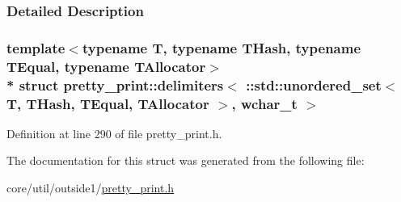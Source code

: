 \subsubsection{Detailed Description}
\subsubsection*{template$<$typename T, typename T\+Hash, typename T\+Equal, typename T\+Allocator$>$\\*
struct pretty\+\_\+print\+::delimiters$<$ \+::std\+::unordered\+\_\+set$<$ T, T\+Hash, T\+Equal, T\+Allocator $>$, wchar\+\_\+t $>$}



Definition at line 290 of file pretty\+\_\+print.\+h.



The documentation for this struct was generated from the following file\+:\begin{DoxyCompactItemize}
\item 
core/util/outside1/\hyperlink{pretty__print_8h}{pretty\+\_\+print.\+h}\end{DoxyCompactItemize}
